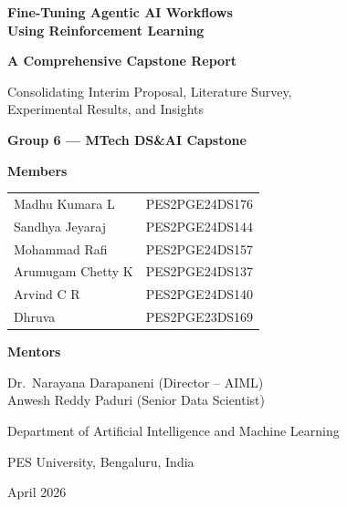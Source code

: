 \documentclass[12pt,a4paper]{report}
\theoremstyle{definition}
\newcommand{\reportdate}{April 2026}
\begin{document}
\hypersetup{pageanchor=false}
\begin{titlepage}
\thispagestyle{empty}
\centering
\vspace*{0.8cm}

{\Huge\bfseries Fine-Tuning Agentic AI Workflows\\Using Reinforcement Learning\par}
\vspace{0.3cm}
{\Large\bfseries A Comprehensive Capstone Report\par}
\vspace{0.2cm}
{\large Consolidating Interim Proposal, Literature Survey,\\Experimental Results, and Insights\par}

\vspace{0.8cm}
{\Large\bfseries Group 6 --- MTech DS\&AI Capstone\par}

\vspace{0.6cm}
{\large\textbf{Members}\par}
\vspace{0.2cm}
\begin{tabular}{@{}ll@{}}
    Madhu Kumara L & PES2PGE24DS176 \\
    Sandhya Jeyaraj & PES2PGE24DS144 \\
    Mohammad Rafi & PES2PGE24DS157 \\
    Arumugam Chetty K & PES2PGE24DS137 \\
    Arvind C R & PES2PGE24DS140 \\
    Dhruva & PES2PGE23DS169 \\
\end{tabular}

\vspace{0.6cm}
{\large\textbf{Mentors}\par}
\vspace{0.2cm}
Dr.\ Narayana Darapaneni (Director -- AIML)\\
Anwesh Reddy Paduri (Senior Data Scientist)

\vfill
{\large Department of Artificial Intelligence and Machine Learning\par}
{\large PES University, Bengaluru, India\par}
\vspace{0.4cm}
{\large \reportdate\par}
\end{titlepage}
\hypersetup{pageanchor=true}
\end{document}
